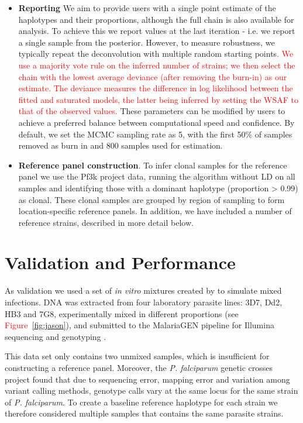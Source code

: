 \documentclass{bioinfo}
\begin{document}
\begin{itemize}
\item {\bf Reporting} We aim to provide users with a single point estimate of the haplotypes and their proportions, although the full chain is also available for analysis.  To achieve this we report values at the last iteration - i.e. we report a single sample from the posterior.  However, to measure robustness, we typically repeat the deconvolution with multiple random starting points\textcolor{red}{. We use a majority vote rule on the inferred number of strains; we then select the chain with the lowest average deviance (after removing the burn-in) as our estimate. The deviance measures the difference in log likelihood between the fitted and saturated models, the latter being inferred by setting the WSAF to that of the observed values.} These parameters can be modified by users to achieve a preferred balance between computational speed and confidence.  By default, we set the MCMC sampling rate as 5, with the first 50\% of samples removed as burn in and 800 samples used for estimation.

\item {\bf Reference panel construction}. To infer clonal samples for the reference panel we use the Pf3k \citep{Pf3k2016} project data, running the algorithm without LD on all samples and identifying those with a dominant haplotype (proportion > 0.99) as clonal.  These clonal samples are grouped by region of sampling to form location-specific reference panels.  In addition, we have included a number of reference strains, described in more detail below.

\end{itemize}



\section{Validation and Performance}

As validation we used a set of {\it in vitro} mixtures created by \citet{Wendler2015} to simulate mixed infections. DNA was extracted from four laboratory parasite lines: 3D7, Dd2, HB3 and 7G8, experimentally mixed in different proportions (see \textcolor{red}{Figure~\ref{fig:jason}}), and submitted to the MalariaGEN pipeline \citep{MalariaGen2008} for Illumina sequencing and genotyping \citep{Manske2012}.

This data set only contains two unmixed samples, which is insufficient for constructing a reference panel. Moreover, the {\em P. falciparum} genetic crosses project \citep{Miles2016} found that due to sequencing error, mapping error and variation among variant calling methods, genotype calls vary at the same locus for the same strain of {\it P. falciparum}. To create a baseline reference haplotype for each strain we therefore considered multiple samples that contains the same parasite strains.
\end{document}
